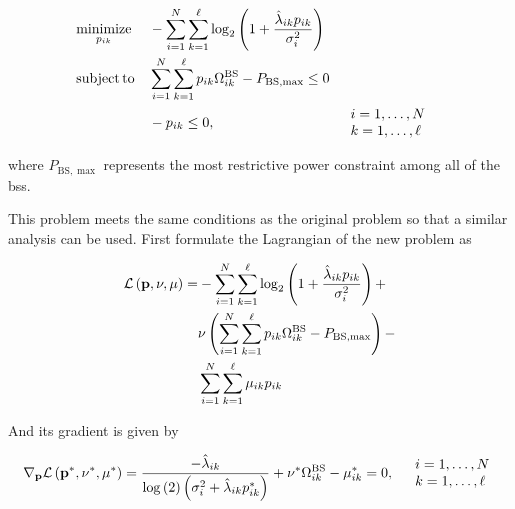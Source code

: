 \begin{equation} \label{eq:optim_modif_wf}
\begin{aligned}
	&\operatorname*{minimize}\limits_{p_{ik}} &&-\sum\limits_{i = 1}^N
	\sum\limits_{k = 1}^\ell \log_2\left( 1 +
	\frac{\hat{\lambda}_{ik} p_{ik}}{\sigma_i^2} \right)\\
	&\operatorname*{subject\,to} &&\sum\limits_{i = 1}^N \sum\limits_{k = 1}^\ell p_{ik} \Omega_{ik}^{\text{BS}} -
    P_{\text{BS},\max} \leq 0\\
    & &&-p_{ik} \leq 0, &&
	\begin{array}{l}
        i = 1, \ldots, N\\
        k = 1, \ldots, \ell
	\end{array}
\end{aligned}
\end{equation}

\noindent
where $P_{\text{BS}, \max}$ represents the most restrictive power constraint
among all of the \glspl{bs}.

This problem meets the same conditions as the original problem so that a similar
analysis can be used. First formulate the Lagrangian of the new problem as

\begin{equation} \label{eq:modif_wf_lagrangian}
\begin{aligned}
    \mathcal{L}\left(\mathbf{p}, \nu, \mathbf{\mu}\right) =
    & -\sum\limits_{i = 1}^N
        \sum\limits_{k = 1}^\ell \log_2\left( 1 +
        \frac{\hat{\lambda}_{ik} p_{ik}}{\sigma_i^2} \right) + \\
    & \nu\left(
        \sum\limits_{i = 1}^N \sum\limits_{k = 1}^\ell p_{ik} \Omega_{ik}^{\text{BS}} -
        P_{\text{BS},\max}\right) - \\
    & \sum\limits_{i = 1}^N \sum\limits_{k = 1}^\ell \mu_{ik} p_{ik}
\end{aligned}
\end{equation}

And its gradient is given by

\begin{equation} \label{eq:modif_wf_gradient}
    \mathbf{\nabla}_{\mathbf{p}} \mathcal{L}\left(\mathbf{p}^\ast, \nu^\ast, \mathbf{\mu}^{\ast}
    \right) = 
    \frac{-\hat{\lambda}_{ik}}{\log\left(2\right)\left(\sigma_i^2 +
    \hat{\lambda}_{ik} p_{ik}^\ast\right)} +
    \nu^\ast \Omega_{ik}^{\text{BS}} - \mu_{ik}^\ast = 0,\quad
	\begin{array}{l}
        i = 1, \ldots, N\\
        k = 1, \ldots, \ell
	\end{array}\\
\end{equation}

